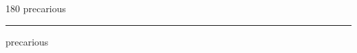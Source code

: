 
\begin{frame}
\begin{center}
\begin{turn}{180}
{\fontsize{2.5cm}{1em}\selectfont precarious}
\end{turn}
\vspace{1em}\par  
\hrule
\vspace{1em}\par  
{\fontsize{2.5cm}{1em}\selectfont precarious}
\end{center}
\end{frame}
